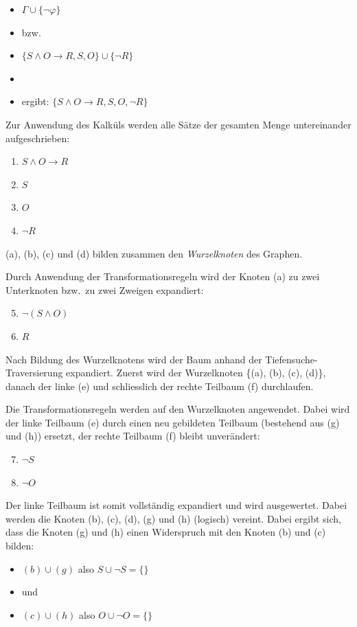 \begin{itemize}
    \item $\Gamma \cup \{\neg\varphi\}$
    \item[] bzw.
    \item $\{S \wedge O \rightarrow R, S, O\} \cup \{\neg R\}$
    \item[]
    \item[] ergibt: $\{S \wedge O \rightarrow R, S, O, \neg R\}$
\end{itemize}

Zur Anwendung des Kalküls werden alle Sätze der gesamten Menge untereinander aufgeschrieben:
\begin{enumerate}[label= (\alph*)]
    \item $ S \wedge O \rightarrow R $
    \item $S$
    \item $O$
    \item $\neg R$
\end{enumerate}

(a), (b), (c) und (d) bilden zusammen den \textit{Wurzelknoten} des Graphen.

Durch Anwendung der Transformationsregeln wird der Knoten (a) zu zwei Unterknoten bzw.\ zu zwei Zweigen expandiert:
\begin{enumerate}[label= (\alph*)]
    \setcounter{enumi}{4}
    \item $ \neg(S \wedge O) $
    \item $R$
\end{enumerate}

Nach Bildung des Wurzelknotens wird der Baum anhand der Tiefensuche-Traversierung expandiert. Zuerst wird der Wurzelknoten \{(a), (b), (c), (d)\}, danach der linke (e) und schliesslich der rechte Teilbaum (f) durchlaufen.

Die Transformationsregeln werden auf den Wurzelknoten angewendet. Dabei wird der linke Teilbaum (e) durch einen neu gebildeten Teilbaum (bestehend aus (g) und (h)) ersetzt, der rechte Teilbaum (f) bleibt unverändert:
\begin{enumerate}[label= (\alph*)]
    \setcounter{enumi}{6}
    \item $\neg S$
    \item $\neg O$
\end{enumerate}

Der linke Teilbaum ist somit vollständig expandiert und wird ausgewertet. Dabei werden die Knoten (b), (c), (d), (g) und (h) (logisch) vereint. Dabei ergibt sich,  dass die Knoten (g) und (h) einen Widerspruch mit den Knoten (b) und (c) bilden:
\begin{itemize}
    \item $(b) \cup (g)$ also $S \cup \neg S = \{\}$
    \item[] und
    \item $(c) \cup (h)$ also $O \cup \neg O = \{\}$
\end{itemize}

